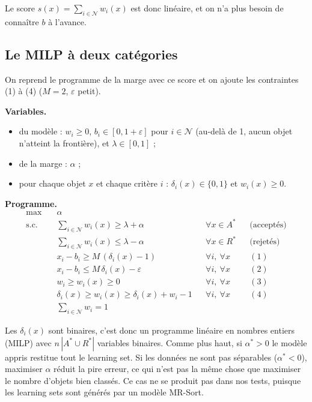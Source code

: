 \documentclass[10pt,a4paper]{article}
\newcommand{\N}{\mathcal{N}}
\begin{document}
Le score $s(x)=\sum_{i\in\N} w_i(x)$ est donc linéaire, et on n'a plus besoin de connaître $b$ à l'avance.

\subsection*{Le MILP à deux catégories}

On reprend le programme de la marge avec ce score et on ajoute les contraintes (1) à (4) ($M=2$, $\varepsilon$ petit).

\medskip
\textbf{Variables.}
\begin{itemize}
  \item du modèle : $w_i\geq 0$, $b_i\in[0,1+\varepsilon]$ pour $i\in\N$ (au-delà de 1, aucun objet n'atteint la frontière), et $\lambda\in[0,1]$ ;
  \item de la marge : $\alpha$ ;
  \item pour chaque objet $x$ et chaque critère $i$ : $\delta_i(x)\in\{0,1\}$ et $w_i(x)\geq 0$.
\end{itemize}

\medskip
\textbf{Programme.}
\begin{align*}
\max\quad & \alpha \\[4pt]
\text{s.c.}\quad & \textstyle\sum_{i\in\N} w_i(x) \geq \lambda + \alpha && \forall x\in A^* && \text{(acceptés)}\\
& \textstyle\sum_{i\in\N} w_i(x) \leq \lambda - \alpha && \forall x\in R^* && \text{(rejetés)}\\[4pt]
& x_i-b_i \geq M\,(\delta_i(x)-1) && \forall i,\ \forall x && (1)\\
& x_i-b_i \leq M\,\delta_i(x)-\varepsilon && \forall i,\ \forall x && (2)\\[4pt]
& w_i \geq w_i(x) \geq 0 && \forall i,\ \forall x && (3)\\
& \delta_i(x) \geq w_i(x) \geq \delta_i(x)+w_i-1 && \forall i,\ \forall x && (4)\\[4pt]
& \textstyle\sum_{i\in\N} w_i = 1
\end{align*}

\medskip
Les $\delta_i(x)$ sont binaires, c'est donc un programme linéaire en nombres entiers (MILP) avec $n\,|A^*\cup R^*|$
variables binaires. Comme plus haut, si $\alpha^*>0$ le modèle appris restitue tout le learning set.
Si les données ne sont pas séparables ($\alpha^*<0$), maximiser $\alpha$ réduit la pire erreur, ce qui n'est pas la même chose
que maximiser le nombre d'objets bien classés. Ce cas ne se produit pas dans nos tests, puisque les learning sets sont
générés par un modèle MR-Sort.
\end{document}
